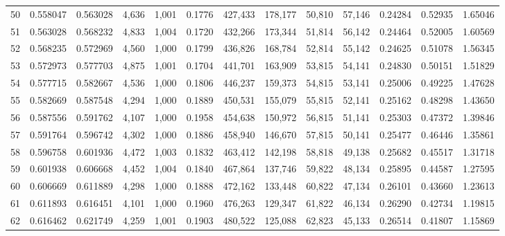 \begin{tabular}{rrrrrrrrrrrrr}
50  &  0.558047 &  0.563028 &   4,636 &  1,001 &                                     0.1776 &  427,433 &  178,177 &   50,810 &   57,146 &  0.24284 &  0.52935 &  1.65046 \\
51  &  0.563028 &  0.568232 &   4,833 &  1,004 &                                     0.1720 &  432,266 &  173,344 &   51,814 &   56,142 &  0.24464 &  0.52005 &  1.60569 \\
52  &  0.568235 &  0.572969 &   4,560 &  1,000 &                                     0.1799 &  436,826 &  168,784 &   52,814 &   55,142 &  0.24625 &  0.51078 &  1.56345 \\
53  &  0.572973 &  0.577703 &   4,875 &  1,001 &                                     0.1704 &  441,701 &  163,909 &   53,815 &   54,141 &  0.24830 &  0.50151 &  1.51829 \\
54  &  0.577715 &  0.582667 &   4,536 &  1,000 &                                     0.1806 &  446,237 &  159,373 &   54,815 &   53,141 &  0.25006 &  0.49225 &  1.47628 \\
55  &  0.582669 &  0.587548 &   4,294 &  1,000 &                                     0.1889 &  450,531 &  155,079 &   55,815 &   52,141 &  0.25162 &  0.48298 &  1.43650 \\
56  &  0.587556 &  0.591762 &   4,107 &  1,000 &                                     0.1958 &  454,638 &  150,972 &   56,815 &   51,141 &  0.25303 &  0.47372 &  1.39846 \\
57  &  0.591764 &  0.596742 &   4,302 &  1,000 &                                     0.1886 &  458,940 &  146,670 &   57,815 &   50,141 &  0.25477 &  0.46446 &  1.35861 \\
58  &  0.596758 &  0.601936 &   4,472 &  1,003 &                                     0.1832 &  463,412 &  142,198 &   58,818 &   49,138 &  0.25682 &  0.45517 &  1.31718 \\
59  &  0.601938 &  0.606668 &   4,452 &  1,004 &                                     0.1840 &  467,864 &  137,746 &   59,822 &   48,134 &  0.25895 &  0.44587 &  1.27595 \\
60  &  0.606669 &  0.611889 &   4,298 &  1,000 &                                     0.1888 &  472,162 &  133,448 &   60,822 &   47,134 &  0.26101 &  0.43660 &  1.23613 \\
61  &  0.611893 &  0.616451 &   4,101 &  1,000 &                                     0.1960 &  476,263 &  129,347 &   61,822 &   46,134 &  0.26290 &  0.42734 &  1.19815 \\
62  &  0.616462 &  0.621749 &   4,259 &  1,001 &                                     0.1903 &  480,522 &  125,088 &   62,823 &   45,133 &  0.26514 &  0.41807 &  1.15869 \\

\end{tabular}
